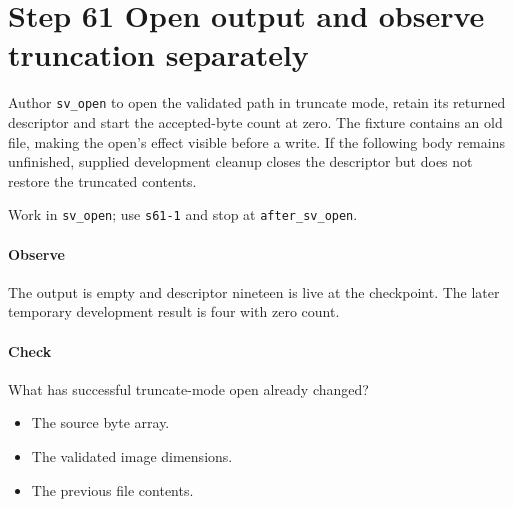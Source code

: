 \section{Step 61 Open output and observe truncation separately}\label{qoi-s61}
Author \texttt{sv\_open} to open the validated path in truncate mode, retain its returned descriptor and start the accepted-byte count at zero. The fixture contains an old file, making the open’s effect visible before a write. If the following body remains unfinished, supplied development cleanup closes the descriptor but does not restore the truncated contents.

Work in \texttt{sv\_open}; use \texttt{s61-1} and stop at \texttt{after\_sv\_open}.

\paragraph{Observe} The output is empty and descriptor nineteen is live at the checkpoint. The later temporary development result is four with zero count.

\paragraph{Check} What has successful truncate-mode open already changed?
\begin{itemize}
  \item[A.] The source byte array.
  \item[B.] The validated image dimensions.
  \item[C.] The previous file contents.
\end{itemize}
